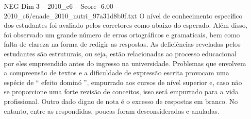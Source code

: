 \begin{textsample}{NEG Dim 3 – 2010\_c6 – Score -6.00 – 2010\_c6/enade\_2010\_nutri\_97a31d8b0f.txt}
O nível de conhecimento específico dos estudantes foi avaliado pelos corretores como abaixo do esperado.
Além disso, foi observado um grande número de erros ortográficos e gramaticais, bem como falta de clareza na forma de redigir as respostas.
As deficiências reveladas pelos estudantes são estruturais, ou seja, estão relacionadas ao processo educacional por eles empreendido antes do ingresso na universidade.
Problemas que envolvem a compreensão de textos e a dificuldade de expressão escrita provocam uma espécie de “ efeito dominó ”, empurrado aos cursos de nível superior e, caso não se proporcione uma forte revisão de conceitos, isso será empurrado para a vida profissional.
Outro dado digno de nota é o excesso de respostas em branco.
No entanto, entre as respondidas, poucas foram desconsideradas e anuladas.

\end{textsample}
